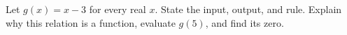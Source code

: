 Let $g(x)=x-3$ for every real $x$. State the input, output, and rule. Explain why this relation is a function, evaluate $g(5)$, and find its zero.
